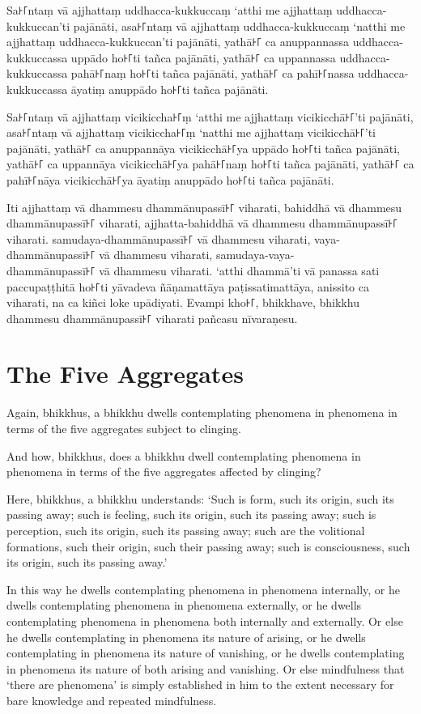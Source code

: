 \paliPage

Sa꜔꜒ntaṃ vā ajjhattaṃ uddhacca-kukkuccaṃ ‘atthi me ajjhattaṃ uddhacca-kukkuccan’ti pajānāti,
asa꜔꜒ntaṃ vā ajjhattaṃ uddhacca-kukkuccaṃ ‘natthi me ajjhattaṃ uddhacca-kukkuccan’ti pajānāti,
yathā꜔꜒ ca anuppannassa uddhacca-kukkuccassa uppādo ho꜔꜒ti tañca pajānāti,
yathā꜔꜒ ca uppannassa uddhacca-kukkuccassa pahā꜔꜒naṃ ho꜔꜒ti tañca pajānāti,
yathā꜔꜒ ca pahī꜔꜒nassa uddhacca-kukkuccassa āyatiṃ anuppādo ho꜔꜒ti tañca pajānāti.

Sa꜔꜒ntaṃ vā ajjhattaṃ vicikiccha꜔꜒ṃ ‘atthi me ajjhattaṃ vicikicchā꜔꜒’ti pajānāti,
asa꜔꜒ntaṃ vā ajjhattaṃ vicikiccha꜔꜒ṃ ‘natthi me ajjhattaṃ vicikicchā꜔꜒’ti pajānāti,
yathā꜔꜒ ca anuppannāya vicikicchā꜔꜒ya uppādo ho꜔꜒ti tañca pajānāti,
yathā꜔꜒ ca uppannāya vicikicchā꜔꜒ya pahā꜔꜒naṃ ho꜔꜒ti tañca pajānāti,
yathā꜔꜒ ca pahī꜔꜒nāya vicikicchā꜔꜒ya āyatiṃ anuppādo ho꜔꜒ti tañca pajānāti.

Iti ajjhattaṃ vā dhammesu dhammānupassī꜔꜒ viharati,
bahiddhā vā dhammesu dhammānupassī꜔꜒ viharati,
ajjhatta-bahiddhā vā dhammesu dhammānupassī꜔꜒ viharati.
samudaya-dhammānupassī꜔꜒ vā dhammesu viharati,
vaya-dhammānupassī꜔꜒ vā dhammesu viharati,
samudaya-vaya-\\ dhammānupassī꜔꜒ vā dhammesu viharati.
‘atthi dhammā’ti vā panassa sati paccupaṭṭhitā ho꜔꜒ti
yāvadeva ñāṇamattāya paṭissatimattāya, anissito ca viharati,
na ca kiñci loke upādiyati. Evampi kho꜔꜒, bhikkhave, bhikkhu
dhammesu dhammānupassī꜔꜒ viharati pañcasu nīvaraṇesu.


\englishPage
\section{The Five Aggregates}

Again, bhikkhus, a bhikkhu dwells contemplating phenomena in phenomena in terms
of the five aggregates subject to clinging.

And how, bhikkhus, does a bhikkhu dwell contemplating phenomena in phenomena in
terms of the five aggregates affected by clinging?

Here, bhikkhus, a bhikkhu understands:
`Such is form, such its origin, such its passing away;
such is feeling, such its origin, such its passing away;
such is perception, such its origin, such its passing away;
such are the volitional formations, such their origin, such their passing away;
such is consciousness, such its origin, such its passing away.'

In this way he dwells contemplating phenomena in phenomena internally, or he
dwells contemplating phenomena in phenomena externally, or he dwells
contemplating phenomena in phenomena both internally and externally. Or else he
dwells contemplating in phenomena its nature of arising, or he dwells
contemplating in phenomena its nature of vanishing, or he dwells contemplating
in phenomena its nature of both arising and vanishing. Or else mindfulness that
‘there are phenomena’ is simply established in him to the extent necessary for
bare knowledge and repeated mindfulness.

